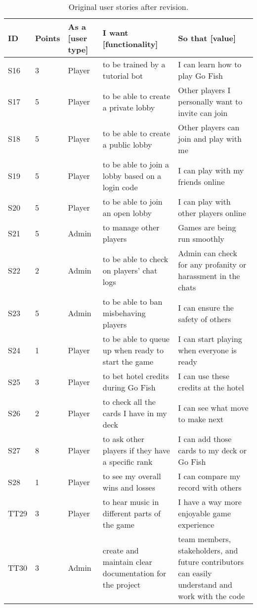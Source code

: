 \pagebreak
\begin{table}[h!]
\centering
\small
\begin{tabularx}{\textwidth}{|l|l|p{1cm}|X|X|}
\hline
\textbf{ID} & \textbf{Points} & \textbf{As a [user type]} & \textbf{I want [functionality]} & \textbf{So that [value]} \\ \hline
S16 & 3 & Player & to be trained by a tutorial bot & I can learn how to play Go Fish \\ \hline
S17 & 5 & Player & to be able to create a private lobby & Other players I personally want to invite can join \\ \hline
S18 & 5 & Player & to be able to create a public lobby & Other players can join and play with me \\ \hline
S19 & 5 & Player & to be able to join a lobby based on a login code & I can play with my friends online \\ \hline
S20 & 5 & Player & to be able to join an open lobby & I can play with other players online \\ \hline
S21 & 5 & Admin & to manage other players & Games are being run smoothly \\ \hline
S22 & 2 & Admin & to be able to check on players' chat logs & Admin can check for any profanity or harassment in the chats \\ \hline
S23 & 5 & Admin & to be able to ban misbehaving players & I can ensure the safety of others \\ \hline
S24 & 1 & Player & to be able to queue up when ready to start the game & I can start playing when everyone is ready \\ \hline
S25 & 3 & Player & to bet hotel credits during Go Fish & I can use these credits at the hotel \\ \hline
S26 & 2 & Player & to check all the cards I have in my deck & I can see what move to make next \\ \hline
S27 & 8 & Player & to ask other players if they have a specific rank & I can add those cards to my deck or Go Fish \\ \hline
S28 & 1 & Player & to see my overall wins and losses & I can compare my record with others \\ \hline
\rowcolor{cyan!25}
TT29 & 3 & Player & to hear music in different parts of the game & I have a way more enjoyable game experience \\ \hline
\rowcolor{cyan!25}
TT30 & 3 & Admin & create and maintain clear documentation for the project & team members, stakeholders, and future contributors can easily understand and work with the code\\ \hline
\end{tabularx}
\caption{Original user stories after revision.}
\end{table}

